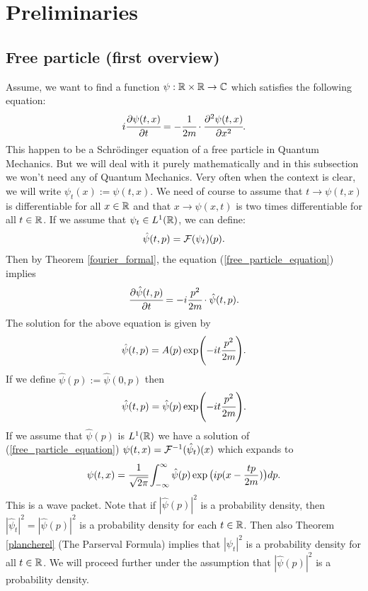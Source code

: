 \documentclass[main.tex]{subfiles}
\begin{document}
\section{Preliminaries}
\subsection{Free particle (first overview)}
Assume, we want to find a function $\psi: \mathbb{R} \times \mathbb{R} \to \mathbb{C}$ which satisfies the following equation:
\begin{equation}
\label{free_particle_equation}
    i\cfrac{\partial \psi(t, x)}{\partial t} = - \cfrac{1}{2m} \cdot \cfrac{\partial^2 \psi(t,x)}{\partial x^2}.
\end{equation}
This happen to be a Schrödinger equation of a free particle in Quantum Mechanics. But we will deal with it purely mathematically and in this subsection we won't need any of Quantum Mechanics.
Very often when the context is clear, we will write $\psi_t(x):=\psi(t,x).$
We need of course to assume that $t\to \psi(t,x)$ is differentiable for all $x\in \mathbb{R}$ and that $x\to \psi(x, t)$ is two times differentiable for all $t\in \mathbb{R}$.
If we assume that $\psi_t\in L^1(\mathbb{R})$, we can define:
\begin{equation}
    \hat{\psi}(t,p) = \mathcal{F}(\psi_t)(p).
\end{equation}
Then by Theorem \ref{fourier_formal}, the equation (\ref{free_particle_equation}) implies
\begin{equation}
\cfrac{\partial \hat{\psi}(t, p)}{\partial t} = -i \cfrac{p^2}{2m}\cdot \hat{\psi}(t, p).
\end{equation}
The solution for the above equation is given by
\begin{equation}
    \hat{\psi}(t, p) = A(p)\exp(-it\cfrac{p^2}{2m}).
\end{equation}
If we define $\hat{\psi}(p):= \hat{\psi}(0, p)$ then
\begin{equation}
\label{free-momentum-representation}
    \hat{\psi}(t, p) = \hat{\psi}(p)\exp(-it\cfrac{p^2}{2m}).
\end{equation}
If we assume that $\hat{\psi}(p)$ is $L^1(\mathbb{R})$ we have a solution of (\ref{free_particle_equation}) $\psi(t, x) = \mathcal{F}^{-1}(\hat{\psi}_t)(x)$ which expands to
\begin{equation}
    \psi(t, x) = \cfrac{1}{\sqrt{2\pi}}\int_{-\infty}^{\infty} \hat{\psi}(p) \exp\big(ip(x - \frac{tp}{2m})\big) dp.
\end{equation}
This is a wave packet.
Note that if $|\hat{\psi}(p)|^2$ is a probability density, then $|\hat{\psi}_t|^2 = |\hat{\psi}(p)|^2$ is a probability density for each $t\in\mathbb{R}$. Then also Theorem \ref{plancherel} (The Parserval Formula) implies that $|\psi_t|^2$ is a probability density for all $t\in \mathbb{R}$. We will proceed further under the assumption that $|\hat{\psi}(p)|^2$ is a probability density.
\end{document}
